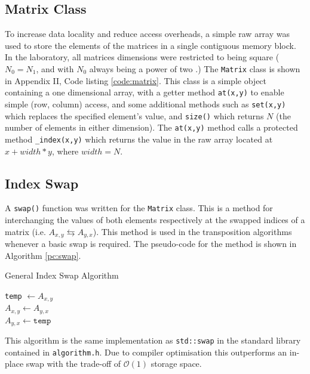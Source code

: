 \documentclass[10 pt, conference]{cssconf}
\begin{document}
\begin{multicols}{2}
\section{Matrix Class}
To increase data locality and reduce access overheads, a simple raw array was used to store the elements of the matrices in a single contiguous memory block. In the laboratory, all matrices dimensions were restricted to being square ($N_0 = N_1$, and with $N_0$ always being a power of two \cite{lab2:assignment}.) The \verb|Matrix| class is shown in Appendix II, Code listing \ref{code:matrix}. This class is a simple object containing a one dimensional array, with a getter method \verb|at(x,y)| to enable simple (row, column) access, and some additional methods such as \verb|set(x,y)| which replaces the specified element's value, and \verb|size()| which returns $N$ (the number of elements in either dimension). The \verb|at(x,y)| method calls a protected method \verb|_index(x,y)| which returns the value in the raw array located at $x + width*y$, where $width=N$.

\subsection{Index Swap}
 A \verb|swap()| function was written for the \verb|Matrix| class. This is a method for interchanging the values of both elements respectively at the swapped indices of a matrix (i.e. {$A_{x,y} \leftrightarrows A_{y,x}$}). This method is used in the transposition algorithms whenever a basic swap is required. The pseudo-code for the method is shown in Algorithm \ref{pc:swap}.

\vspace{5pt}
\begin{algorithm}[H]
    \small
    \caption{General Index Swap Algorithm}\label{pc:swap}
    	\SetAlgoLined
	\texttt{temp} $\leftarrow A_{x,y}$\\
	$A_{x,y} \leftarrow A_{y,x}$\\
    $A_{y,x} \leftarrow \texttt{temp}$\\
    \vspace{6pt}
\end{algorithm}
\vspace{5pt}

This algorithm is the same implementation as \verb|std::swap| in the standard library contained in \verb|algorithm.h|. Due to compiler optimisation this outperforms an in-place swap with the trade-off of $\mathcal{O}(1)$ storage space.


\end{multicols}
\end{document}
